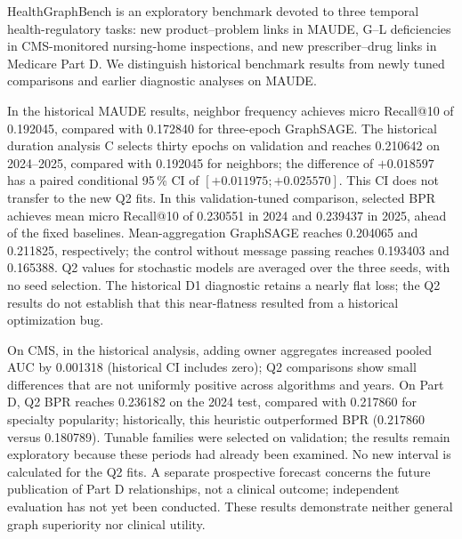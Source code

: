 HealthGraphBench is an exploratory benchmark devoted to three temporal health-regulatory tasks: new product--problem links in MAUDE, G--L deficiencies in CMS-monitored nursing-home inspections, and new prescriber--drug links in Medicare Part D. We distinguish historical benchmark results from newly tuned comparisons and earlier diagnostic analyses on MAUDE.

In the historical MAUDE results, neighbor frequency achieves micro Recall@10 of 0.192045, compared with 0.172840 for three-epoch GraphSAGE. The historical duration analysis C selects thirty epochs on validation and reaches 0.210642 on 2024--2025, compared with 0.192045 for neighbors; the difference of $+0.018597$ has a paired conditional 95\,\% CI of $[+0.011975;+0.025570]$. This CI does not transfer to the new Q2 fits. In this validation-tuned comparison, selected BPR achieves mean micro Recall@10 of 0.230551 in 2024 and 0.239437 in 2025, ahead of the fixed baselines. Mean-aggregation GraphSAGE reaches 0.204065 and 0.211825, respectively; the control without message passing reaches 0.193403 and 0.165388. Q2 values for stochastic models are averaged over the three seeds, with no seed selection. The historical D1 diagnostic retains a nearly flat loss; the Q2 results do not establish that this near-flatness resulted from a historical optimization bug.

On CMS, in the historical analysis, adding owner aggregates increased pooled AUC by 0.001318 (historical CI includes zero); Q2 comparisons show small differences that are not uniformly positive across algorithms and years. On Part D, Q2 BPR reaches 0.236182 on the 2024 test, compared with 0.217860 for specialty popularity; historically, this heuristic outperformed BPR (0.217860 versus 0.180789). Tunable families were selected on validation; the results remain exploratory because these periods had already been examined. No new interval is calculated for the Q2 fits. A separate prospective forecast concerns the future publication of Part D relationships, not a clinical outcome; independent evaluation has not yet been conducted. These results demonstrate neither general graph superiority nor clinical utility.
